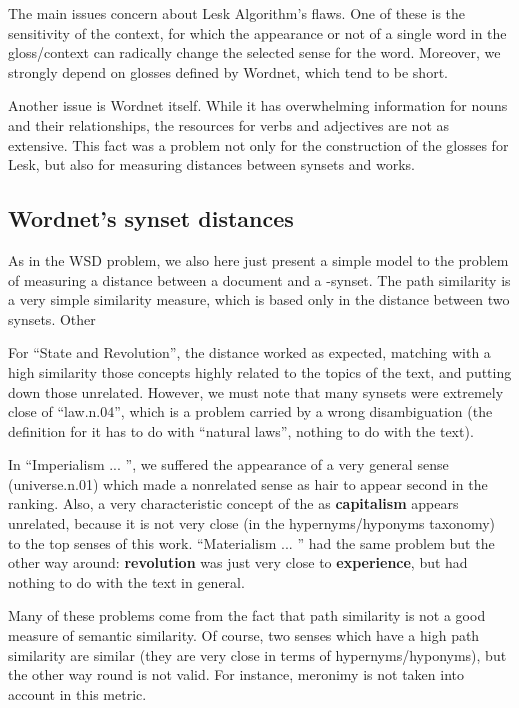 \documentclass{pnastwo}
\begin{document}
\begin{article}
The main issues concern about Lesk Algorithm's flaws. One of these is the sensitivity of the context, for which the appearance or not of a single word in the gloss/context can radically change the selected sense for the word. Moreover, we strongly depend on glosses defined by Wordnet, which tend to be short.

Another issue is Wordnet itself. While it has overwhelming information for nouns and their relationships, the resources for verbs and adjectives are not as extensive. This fact was a problem not only for the construction of the glosses for Lesk, but also for measuring distances between synsets and works.

\subsection{Wordnet's synset distances}

As in the WSD problem, we also here just present a simple model to the problem of measuring a distance between a document and a -synset. The path similarity is a very simple similarity measure, which is based only in the distance between two synsets. Other 

For ``State and Revolution'', the distance worked as expected, matching with a high similarity those concepts highly related to the topics of the text, and putting down those unrelated. However, we must note that many synsets were extremely close of ``law.n.04'', which is a problem carried by a wrong disambiguation (the definition for it has to do with ``natural laws'', nothing to do with the text).

In ``Imperialism ... '', we suffered the appearance of a very general sense (universe.n.01) which made a nonrelated sense as hair to appear second in the ranking. Also, a very characteristic concept of the  as \textbf{capitalism} appears unrelated, because it is not very close (in the hypernyms/hyponyms taxonomy) to the top senses of this work. ``Materialism ... '' had the same problem but the other way around: \textbf{revolution} was just very close to \textbf{experience}, but had nothing to do with the text in general.

Many of these problems come from the fact that path similarity is not a good measure of semantic similarity. Of course, two senses which have a high path similarity are similar (they are very close in terms of hypernyms/hyponyms), but the other way round is not valid. For instance, meronimy is not taken into account in this metric.
 

\end{article}
\end{document}

